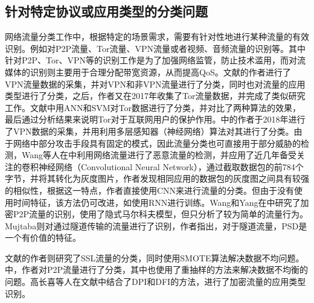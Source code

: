 \documentclass[a4papper]{article}
\begin{document}
\subsection{针对特定协议或应用类型的分类问题}
\par\setlength{\parindent}{2em} %
网络流量分类工作中，根据特定的场景需求，需要有针对性地进行某种流量的有效识别。例如对P2P流量、Tor流量、VPN流量或者视频、音频流量的识别等。其中针对P2P、Tor、VPN等的识别工作是为了加强网络监管，防止技术滥用，而对流媒体的识别则主要用于合理分配带宽资源，从而提高QoS。文献\cite{unb2016vpn}的作者进行了VPN流量数据的采集，并对VPN和非VPN流量进行了分类，同时也对流量的应用类型进行了分类，之后，作者又在2017年收集了Tor流量数据，并完成了类似研究工作。文献\cite{hodo2017machine}中用ANN和SVM对Tor数据进行了分类，并对比了两种算法的效果，最后通过分析结果来说明Tor对于互联网用户的保护作用。\cite{miller2018multilayer}中的作者于2018年进行了VPN数据的采集，并用利用多层感知器（神经网络）算法对其进行了分类。由于网络中部分攻击手段具有固定的模式，因此流量分类也可直接用于部分威胁的检测，Wang等人在\cite{wang2017malware}中利用网络流量进行了恶意流量的检测，并应用了近几年备受关注的卷积神经网络（Convolutional Neural Network），通过截取数据包的前784个字节，并将其转化为灰度图片，作者发现相同应用的数据包的灰度图之间具有较强的相似性，根据这一特点，作者直接使用CNN来进行流量的分类。但由于没有使用时间特征，该方法仍可改进，如使用RNN进行训练。Wang和Yang在\cite{wang2014p2pidentifying}中研究了加密P2P流量的识别，使用了隐式马尔科夫模型，但只分析了较为简单的流量行为。Mujtaba则对通过隧道传输的流量进行了识别\cite{mujtaba2015tunnel}，作者指出，对于隧道流量，PSD是一个有价值的特征。
\par\setlength{\parindent}{2em} %
\cite{unb2017tor}文献\cite{陈雪娇2015网络应用流类别不平衡环境下的}的作者则研究了SSL流量的分类，同时使用SMOTE算法解决数据不均问题。\cite{zhong2009p2presample}中，作者对P2P流量进行了分类，其中也使用了重抽样的方法来解决数据不均衡的问题。高长喜等人在文献\cite{高长喜2015基于抽样分组长度分布的加密流量应用识别}中结合了DPI和DFI的方法，进行了加密流量的应用类型识别。
\end{document}
